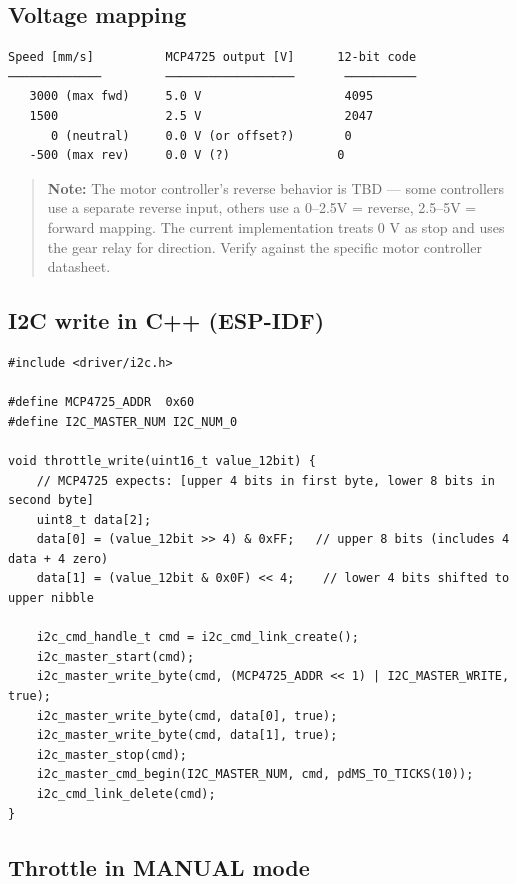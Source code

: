 \documentclass[12pt,a4paper,oneside]{report}
\begin{document}
\subsection{Voltage mapping}\label{voltage-mapping}

\begin{verbatim}
Speed [mm/s]          MCP4725 output [V]      12-bit code
─────────────         ──────────────────       ──────────
   3000 (max fwd)     5.0 V                    4095
   1500               2.5 V                    2047
      0 (neutral)     0.0 V (or offset?)       0
   -500 (max rev)     0.0 V (?)               0
\end{verbatim}

\begin{quote}
\textbf{Note:} The motor controller's reverse behavior is TBD --- some
controllers use a separate reverse input, others use a 0--2.5V = reverse,
2.5--5V = forward mapping. The current implementation treats 0 V as stop and
uses the gear relay for direction. Verify against the specific motor controller
datasheet.
\end{quote}

\subsection{I2C write in C++ (ESP-IDF)}\label{i2c-write-in-c-esp-idf}

\begin{verbatim}
#include <driver/i2c.h>

#define MCP4725_ADDR  0x60
#define I2C_MASTER_NUM I2C_NUM_0

void throttle_write(uint16_t value_12bit) {
    // MCP4725 expects: [upper 4 bits in first byte, lower 8 bits in second byte]
    uint8_t data[2];
    data[0] = (value_12bit >> 4) & 0xFF;   // upper 8 bits (includes 4 data + 4 zero)
    data[1] = (value_12bit & 0x0F) << 4;    // lower 4 bits shifted to upper nibble

    i2c_cmd_handle_t cmd = i2c_cmd_link_create();
    i2c_master_start(cmd);
    i2c_master_write_byte(cmd, (MCP4725_ADDR << 1) | I2C_MASTER_WRITE, true);
    i2c_master_write_byte(cmd, data[0], true);
    i2c_master_write_byte(cmd, data[1], true);
    i2c_master_stop(cmd);
    i2c_master_cmd_begin(I2C_MASTER_NUM, cmd, pdMS_TO_TICKS(10));
    i2c_cmd_link_delete(cmd);
}
\end{verbatim}

\subsection{Throttle in MANUAL mode}\label{throttle-in-manual-mode}
\end{document}
